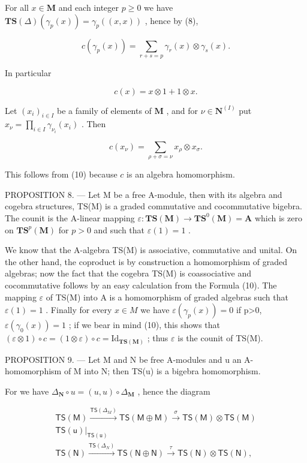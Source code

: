 For all \(x \in \mathbf{M}\) and each integer \(p \geqslant 0\) we have \(\mathbf{TS}(\Delta) (\gamma_p(x)) = \gamma_p((x, x))\) , hence by (8),

\[
c \left(\gamma_ {p} (x)\right) = \sum_ {r + s = p} \gamma_ {r} (x) \otimes \gamma_ {s} (x).\tag{10}
\]

In particular

\[
c (x) = x \otimes 1 + 1 \otimes x.\tag{11}
\]

Let \((x_{i})_{i\in I}\) be a family of elements of \(\mathbf{M}\) , and for \(\nu \in \mathbf{N}^{(I)}\) put \(x_{\nu} = \prod_{i\in I}\gamma_{\nu_i}(x_i)\) . Then

\[
c \left(x _ {\nu}\right) = \sum_ {\rho + \sigma = \nu} x _ {\rho} \otimes x _ {\sigma}.\tag{12}
\]

This follows from (10) because \(c\) is an algebra homomorphism.

PROPOSITION 8. --- Let M be a free A-module, then with its algebra and cogebra structures, TS(M) is a graded commutative and cocommutative bigebra. The counit is the A-linear mapping \(\varepsilon: \mathbf{TS}(\mathbf{M}) \to \mathbf{TS}^0(\mathbf{M}) = \mathbf{A}\) which is zero on \(\mathbf{TS}^p(\mathbf{M})\) for \(p > 0\) and such that \(\varepsilon(1) = 1\) .

We know that the A-algebra TS(M) is associative, commutative and unital. On the other hand, the coproduct is by construction a homomorphism of graded algebras; now the fact that the cogebra TS(M) is coassociative and cocommutative follows by an easy calculation from the Formula (10). The mapping \(\varepsilon\) of TS(M) into A is a homomorphism of graded algebras such that \(\varepsilon(1)=1\) . Finally for every \(x\in M\) we have \(\varepsilon(\gamma_{p}(x))=0\) if p\textgreater0, \(\varepsilon(\gamma_{0}(x))=1\) ; if we bear in mind (10), this shows that \((\varepsilon\otimes1)\circ c=(1\otimes\varepsilon)\circ c=\mathrm{Id}_{\mathbf{TS}(\mathbf{M})}\) ; thus \(\varepsilon\) is the counit of TS(M).

PROPOSITION 9. --- Let M and N be free A-modules and u an A-homomorphism of M into N; then TS(u) is a bigebra homomorphism.

For we have \(\Delta_{\mathbf{N}} \circ u = (u, u) \circ \Delta_{\mathbf{M}}\) , hence the diagram

\[
\begin{array}{c} \mathsf {T S (M)} \xrightarrow {\mathsf {T S} (\Delta_ {M})} \mathsf {T S (M \oplus M)} \xrightarrow {\sigma} \mathsf {T S (M)} \otimes \mathsf {T S (M)} \\ \mathsf {T S (u)} \Bigg | _ {\mathsf {T S (u)}} \\ \mathsf {T S (N)} \xrightarrow {\mathsf {T S} (\Delta_ {N})} \mathsf {T S (N \oplus N)} \xrightarrow {\tau} \mathsf {T S (N)} \otimes \mathsf {T S (N)}, \end{array}
\]

